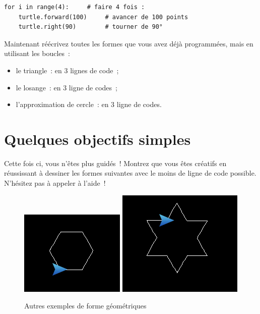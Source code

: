 \documentclass[11pt,a4paper]{article}
\begin{document}
\begin{lstlisting}
for i in range(4):     # faire 4 fois :
    turtle.forward(100)     # avancer de 100 points
    turtle.right(90)        # tourner de 90°
\end{lstlisting}

Maintenant réécrivez toutes les formes que vous avez déjà programmées, mais en
utilisant les boucles~:

\begin{itemize}
\item le triangle~: en 3 lignes de code~;
\item le losange~: en 3 ligne de codes~;
\item l'approximation de cercle~: en 3 ligne de codes.
\end{itemize}

\section{Quelques objectifs simples}
Cette fois ci, vous n'êtes plus guidés~! Montrez que vous êtes créatifs en
réussissant à dessiner les formes suivantes avec le moins de ligne de code
possible. N'hésitez pas à appeler à l'aide~!

\begin{figure}[H]
    \centering
    \includegraphics[height=0.4\textwidth]{img/approx_circle_hexagon}
    \includegraphics[height=0.4\textwidth]{img/star}
    \caption{Autres exemples de forme géométriques}
    \label{fig:ending_examples}
\end{figure}
\end{document}
